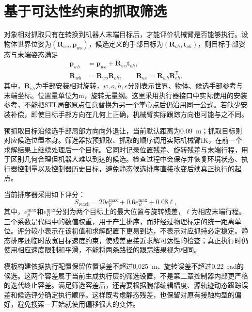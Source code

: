 \section{基于可达性约束的抓取筛选}
\label{sec:grasp_reachability}

对象相对抓取只有在转换到机器人末端目标后，才能评价机械臂是否能够执行。设物体世界位姿为$(\boldsymbol R_{wo},\boldsymbol p_{wo})$，候选定义的手部目标为$(\boldsymbol R_{oh},\boldsymbol t_{oh})$，则目标手部姿态与末端姿态满足
\begin{equation}
 \begin{aligned}
 \boldsymbol p_{wh}&=\boldsymbol p_{wo}+\boldsymbol R_{wo}\boldsymbol t_{oh},\\
 \boldsymbol R_{wh}&=\boldsymbol R_{wo}\boldsymbol R_{oh},\qquad
 \boldsymbol R_{we}=\boldsymbol R_{wh}\boldsymbol R_{eh}^{\mathsf T}.
 \end{aligned}
 \label{eq:ch03_target_transform}
\end{equation}
其中，$\boldsymbol R_{eh}$为手部安装相对旋转，$w,o,h,e$分别表示世界、物体、候选手部参考与末端坐标。位置量单位为m，旋转无量纲。这里采用执行器接口中实际使用的安装参考，不能把STL局部原点任意替换为另一个掌心点后仍沿用同一公式。若缺少安装补偿，即使目标手部方向在几何上正确，机械臂实际跟踪方向也可能与之不同。

预抓取目标沿候选手部局部方向向外退让，当前默认距离为0.09~m；抓取目标则对应候选位置本身。筛选器按预抓取、抓取的顺序调用实际机械臂IK，在前一个求解结果上继续处理后一个目标。它同时记录位置残差、旋转残差与末端行程，用于区别几何合理但机器人难以到达的候选。检查过程中会保存并恢复环境状态、执行器控制量以及控制器历史目标，避免静态候选排序直接改变后续真正执行的起点。

当前排序器采用如下评分：
\begin{equation}
 S_{\mathrm{reach}}=20e_p^{\max}+0.6e_R^{\max}+0.08\ell,
 \label{eq:ch03_reachability_score}
\end{equation}
其中，$e_p^{\max}$和$e_R^{\max}$分别为两个目标上的最大位置与旋转残差，$\ell$为相应末端行程。三个系数是代码中的数值权重，用于产生排序，而非经过物理标定的统一距离单位。评分较小表示在该初值和求解配置下更易到达，不表示对应抓持必定稳定。静态排序还临时放宽目标速度约束，使残差更接近求解可达性的检查；真正执行时仍使用相应速度限制和平滑，不能将两条路径的跟踪结果视为相同。

模板构建依据执行配置保留位置误差不超过0.025~m、旋转误差不超过0.22~rad的候选。这两个容差属于当前生成执行层的筛选设置，不是第二章控制器内部更严格的迭代终止容差。满足筛选容差后，还需要根据腕部编辑幅度、源轨迹动态跟踪误差和候选评分确定执行顺序。这样既考虑静态残差，也保留对原有接触构型的偏好，避免搜索一开始就使用偏移很大的变体。

